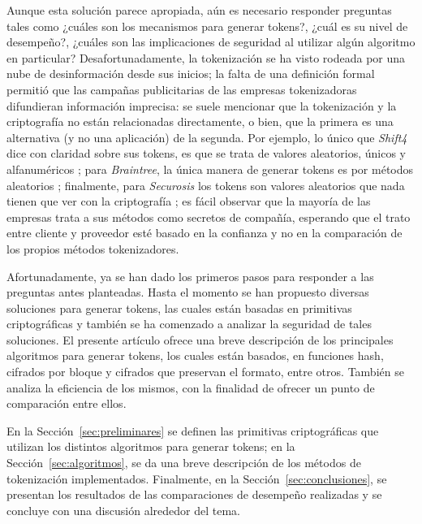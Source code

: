 \documentclass[conference]{IEEEtran}
\begin{document}
  Aunque esta solución parece apropiada, aún es necesario responder preguntas
  tales como ¿cuáles son los mecanismos para generar tokens?, ¿cuál es su nivel
  de desempeño?, ¿cuáles son las implicaciones de seguridad al utilizar algún
  algoritmo en particular? Desafortunadamente, la tokenización se ha visto
  rodeada por una nube de desinformación desde sus inicios; la falta de una
  definición formal permitió que las campañas publicitarias de las empresas
  tokenizadoras difundieran información imprecisa: se suele mencionar que la
  tokenización y la criptografía no están relacionadas directamente, o bien, que
  la primera es una alternativa (y no una aplicación) de la segunda. Por
  ejemplo, lo único que \textit{Shift4} dice con claridad sobre sus tokens, es
  que se trata de valores aleatorios, únicos y alfanuméricos \cite{shif4_uno};
  para \textit{Braintree}, la única manera de generar tokens es por métodos
  aleatorios \cite{braintree_uno}; finalmente, para \textit{Securosis} los
  tokens son valores aleatorios que nada tienen que ver con la criptografía
  \cite{securosis}; es fácil observar que la mayoría de las empresas trata a sus
  métodos como secretos de compañía, esperando que el trato entre cliente y
  proveedor esté basado en la confianza y no en la comparación de los propios
  métodos tokenizadores.

  Afortunadamente, ya se han dado los primeros pasos para responder a las
  preguntas antes planteadas. Hasta el momento se han propuesto diversas
  soluciones para generar tokens, las cuales están basadas en primitivas
  criptográficas y también se ha comenzado a analizar la seguridad de tales
  soluciones. El presente artículo ofrece una breve descripción de los
  principales algoritmos para generar tokens, los cuales están basados, en
  funciones hash, cifrados por bloque y cifrados que preservan el formato, entre
  otros. También se analiza la eficiencia de los mismos, con la finalidad de
  ofrecer un punto de comparación entre ellos.

  En la Sección~\ref{sec:preliminares} se definen las primitivas criptográficas
  que utilizan los distintos algoritmos para generar tokens; en la
  Sección~\ref{sec:algoritmos}, se da una breve descripción de los métodos de
  tokenización implementados. Finalmente, en la Sección~\ref{sec:conclusiones},
  se presentan los resultados de las comparaciones de desempeño realizadas y se
  concluye con una discusión alrededor del tema.
\end{document}

